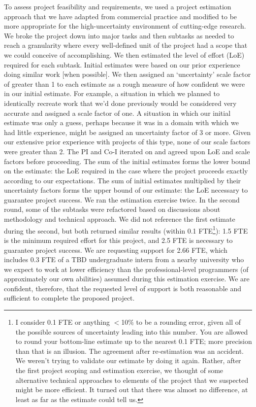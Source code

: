 \documentclass[12pt,oneside]{book}
\begin{document}
\begin{displayquote}
To assess project feasibility and requirements, we used a project estimation approach that we have adapted from commercial practice and modified to be more appropriate for the high-uncertainty environment of cutting-edge research. We broke the project down into major tasks and then subtasks as needed to reach a granularity where every well-defined unit of the project had a scope that we could conceive of accomplishing. We then estimated the level of effort (LoE) required for each subtask. Initial estimates were based on our prior experience doing similar work [when possible]. We then assigned an `uncertainty' scale factor of greater than 1 to each estimate as a rough measure of how confident we were in our initial estimate. For example, a situation in which we planned to identically recreate work that we'd done previously would be considered very accurate and assigned a scale factor of one. A situation in which our initial estimate was only a guess, perhaps because it was in a domain with which we had little experience, might be assigned an uncertainty factor of 3 or more. Given our extensive prior experience with projects of this type, none of our scale factors were greater than 2. The PI and Co-I iterated on and agreed upon LoE and scale factors before proceeding. The sum of the initial estimates forms the lower bound on the estimate: the LoE required in the case where the project proceeds exactly according to our expectations. The sum of initial estimates multiplied by their uncertainty factors forms the upper bound of our estimate: the LoE necessary to guarantee project success. We ran the estimation exercise twice. In the second round, some of the subtasks were refactored based on discussions about methodology and technical approach. We did not reference the first estimate during the second, but both returned similar results (within 0.1 FTE\footnote{I consider 0.1 FTE or anything $<$10\% to be a rounding error, given all of the possible sources of uncertainty leading into this number. You are allowed to round your bottom-line estimate up to the nearest 0.1 FTE; more precision than that is an illusion. The agreement after re-estimation was an accident. We weren't trying to validate our estimate by doing it again. Rather, after the first project scoping and estimation exercise, we thought of some alternative technical approaches to elements of the project that we suspected might be more efficient. It turned out that there was almost no difference, at least as far as the estimate could tell us.
}): 1.5 FTE is the minimum required effort for this project, and 2.5 FTE is necessary to guarantee project success. We are requesting support for 2.66 FTE, which includes 0.3 FTE of a TBD undergraduate intern from a nearby university who we expect to work at lower efficiency than the professional-level programmers (of approximately our own abilities) assumed during this estimation exercise. We are confident, therefore, that the requested level of support is both reasonable and sufficient to complete the proposed project.
\end{displayquote}
\end{document}
